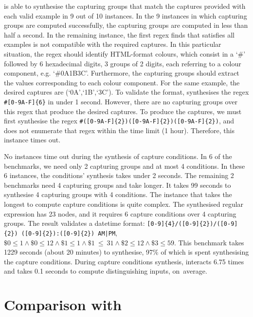 \Forest is able to synthesise the capturing groups that match the captures provided with each valid example in 9 out of 10 instances. In the 9 instances in which capturing groups are computed successfully, the capturing groups are computed in less than half a second.
In the remaining instance, the first regex \Forest finds that satisfies all examples is not compatible with the required captures.
In this particular situation, the regex should identify HTML-format colours, which consist in a `\#' followed by 6 hexadecimal digits, 3 groups of 2 digits, each referring to a colour component, e.g. `\#0A1B3C'.
Furthermore, the capturing groups should extract the values corresponding to each colour component. For the same example, the desired captures are (`0A',`1B',`3C'). To validate the format, \Forest synthesises the regex \verb`#[0-9A-F]{6}` in under 1 second.
However, there are no capturing groups over this regex that produce the desired captures. To produce the captures, we must first synthesise the regex
\verb`#([0-9A-F]{2})([0-9A-F]{2})([0-9A-F]{2})`, and \Forest does not enumerate that regex within the time limit (1 hour). Therefore, this instance times out.

No instances time out during the synthesis of capture conditions.
In 6 of the benchmarks, we need only 2 capturing groups and at most 4 conditions.
In these 6 instances, the conditions' synthesis takes under 2 seconds.
The remaining 2 benchmarks need 4 capturing groups and take longer.
It takes 99 seconds to synthesise 4 capturing groups with 4 conditions.
The instance that takes the longest to compute capture conditions is quite complex. The synthesised regular expression has 23 nodes, and it requires 6 capture conditions over 4 capturing groups. The result validates a datetime format: \verb`[0-9]{4}/([0-9]{2})/([0-9]{2}) ([0-9]{2}):([0-9]{2}) AM|PM`, \(\$0\le1 \land \$0\le12 \land \$1\le1 \land \$1~\le~31 \land \$2\le12 \land \$3\le59\). This benchmark takes 1229 seconds (about 20 minutes) to synthesise, 97\% of which is spent synthesising the capture conditions.
%
During capture conditions synthesis, \Forest interacts 6.75 times and takes 0.1 seconds to compute distinguishing inputs, on~average.


\section{Comparison with \Regel}\label{sec:comp-regel}

